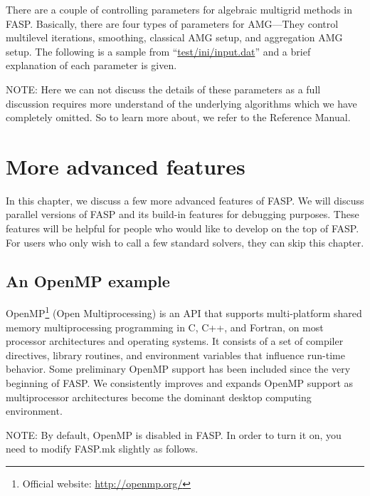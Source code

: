 \documentclass[11pt]{memoir}
\begin{document}
There are a couple of controlling parameters for algebraic multigrid methods in FASP. Basically, there are four types of parameters for AMG---They control multilevel iterations, smoothing, classical AMG setup, and aggregation AMG setup. The following is a sample from ``\url{test/ini/input.dat}'' and a brief explanation of each parameter is given.
%

%

\begin{snugshade}\noindent
NOTE: Here we can not discuss the details of these parameters as a full discussion requires more understand of the underlying algorithms which we have completely omitted. So to learn more about, we refer to the Reference Manual.
\end{snugshade}

\chapter{More  advanced features}\label{ch:advanced}

In this chapter, we discuss a few more advanced features of FASP. We
will discuss parallel versions of FASP and its build-in features for
debugging purposes. These features will be helpful for people who
would like to develop on the top of FASP. For users who only wish to
call a few standard solvers, they can skip this chapter.

\section{An OpenMP example}\label{sec:mop}

OpenMP\footnote{Official website: \url{http://openmp.org/}} (Open Multiprocessing) is an API that supports multi-platform shared memory multiprocessing programming in C, C++, and Fortran, on most processor architectures and operating systems. It consists of a set of compiler directives, library routines, and environment variables that influence run-time behavior. Some preliminary OpenMP support has been included since the very beginning of FASP. We consistently improves and expands OpenMP support as multiprocessor architectures become the dominant desktop computing environment.

\begin{snugshade}\noindent
NOTE: By default, OpenMP is disabled in FASP. In order to turn it on, you need to modify FASP.mk slightly as follows.
\end{snugshade}
\end{document}
